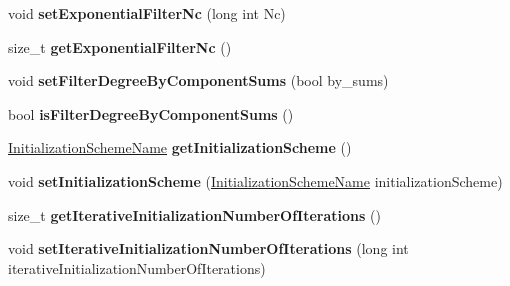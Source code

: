 \begin{DoxyCompactItemize}
\item 
\hypertarget{classnatrium_1_1SolverConfiguration_a9b5459c5abb60e225c635a1b2b7a4d36}{
void {\bfseries setExponentialFilterNc} (long int Nc)}
\label{classnatrium_1_1SolverConfiguration_a9b5459c5abb60e225c635a1b2b7a4d36}

\item 
\hypertarget{classnatrium_1_1SolverConfiguration_a2b494eac29a048b8a484f7047b40efce}{
size\_\-t {\bfseries getExponentialFilterNc} ()}
\label{classnatrium_1_1SolverConfiguration_a2b494eac29a048b8a484f7047b40efce}

\item 
\hypertarget{classnatrium_1_1SolverConfiguration_ae13406455655788dba00183fec9b4c97}{
void {\bfseries setFilterDegreeByComponentSums} (bool by\_\-sums)}
\label{classnatrium_1_1SolverConfiguration_ae13406455655788dba00183fec9b4c97}

\item 
\hypertarget{classnatrium_1_1SolverConfiguration_a0541ca015f1392389d1b3da0832f6b23}{
bool {\bfseries isFilterDegreeByComponentSums} ()}
\label{classnatrium_1_1SolverConfiguration_a0541ca015f1392389d1b3da0832f6b23}

\item 
\hypertarget{classnatrium_1_1SolverConfiguration_afe9fd2087df0ab6066f260bf6bfd03ac}{
\hyperlink{namespacenatrium_a5aad7d448441836f9c631c505cf8cd54}{InitializationSchemeName} {\bfseries getInitializationScheme} ()}
\label{classnatrium_1_1SolverConfiguration_afe9fd2087df0ab6066f260bf6bfd03ac}

\item 
\hypertarget{classnatrium_1_1SolverConfiguration_a4d867b8b8c0c08fc68b95f1a1a52c95d}{
void {\bfseries setInitializationScheme} (\hyperlink{namespacenatrium_a5aad7d448441836f9c631c505cf8cd54}{InitializationSchemeName} initializationScheme)}
\label{classnatrium_1_1SolverConfiguration_a4d867b8b8c0c08fc68b95f1a1a52c95d}

\item 
\hypertarget{classnatrium_1_1SolverConfiguration_aa12123336ffa7489780baa45d99569b1}{
size\_\-t {\bfseries getIterativeInitializationNumberOfIterations} ()}
\label{classnatrium_1_1SolverConfiguration_aa12123336ffa7489780baa45d99569b1}

\item 
\hypertarget{classnatrium_1_1SolverConfiguration_ac4188dce03b129130f153f7028c3f79e}{
void {\bfseries setIterativeInitializationNumberOfIterations} (long int iterativeInitializationNumberOfIterations)}
\label{classnatrium_1_1SolverConfiguration_ac4188dce03b129130f153f7028c3f79e}


\end{DoxyCompactItemize}
